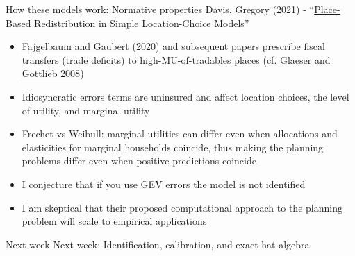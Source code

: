 \documentclass[11pt,notes=hide,aspectratio=169]{beamer}
\begin{document}
\begin{frame}{How these models work: Normative properties}
Davis, Gregory (2021) - ``\href{https://www.nber.org/papers/w29045}{Place-Based Redistribution in Simple Location-Choice Models}''
\begin{itemize}
\item
\href{https://academic.oup.com/qje/article-abstract/135/2/959/5697213}{Fajgelbaum and Gaubert (2020)} and subsequent papers
prescribe fiscal transfers (trade deficits) to high-MU-of-tradables places
(cf. \href{https://www.brookings.edu/wp-content/uploads/2008/03/2008a_bpea_glaeser.pdf}{Glaeser and Gottlieb 2008})
\item
Idiosyncratic errors terms are uninsured and affect location choices, the level of utility, and marginal utility
\item 
Frechet vs Weibull:
marginal utilities can differ even when allocations and elasticities for marginal households coincide,
thus making the planning problems differ even when positive predictions coincide
\item
I conjecture that if you use GEV errors the model is not identified
\item
I am skeptical that their proposed computational approach to the planning problem will scale to empirical applications
\end{itemize}
\end{frame}
\begin{frame}{Next week}
Next week: Identification, calibration, and exact hat algebra
\end{frame}
\end{document}
